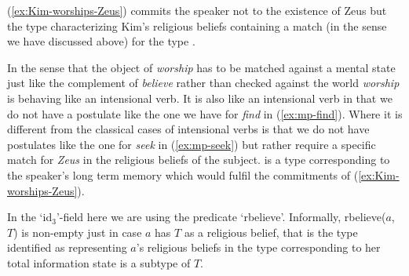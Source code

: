 (\ref{ex:Kim-worships-Zeus}) commits the speaker not to the
existence of Zeus but the type characterizing Kim's religious beliefs
containing a match (in the sense we have discussed above) for the type
\nexteg{}.
\begin{ex} 
\end{ex} 
In the sense that the object of \textit{worship} has to be matched
against a mental state just like the complement of \textit{believe}
rather than checked against the world \textit{worship} is behaving
like an intensional verb.  It is also like an intensional verb in that
we do not have a postulate like the one we have for \textit{find} in
(\ref{ex:mp-find}).  Where it is different from the classical cases of
intensional verbs is that we do not have postulates like the one for
\textit{seek} in (\ref{ex:mp-seek}) but rather require a specific
match for \textit{Zeus} in the religious beliefs of the subject.
\nexteg{} is a type corresponding to the speaker's long term memory
which would fulfil the commitments of (\ref{ex:Kim-worships-Zeus}).
\begin{ex} 
\label{ex:KimWorshipsZeusType}
\end{ex} 
In the `id$_3$'-field here we are using the predicate `rbelieve'.
Informally, rbelieve($a$, $T$) is non-empty just in case $a$ has $T$
as a religious belief, that is the type identified as representing
$a$'s religious beliefs in the type corresponding to her total
information state is a subtype of $T$.

